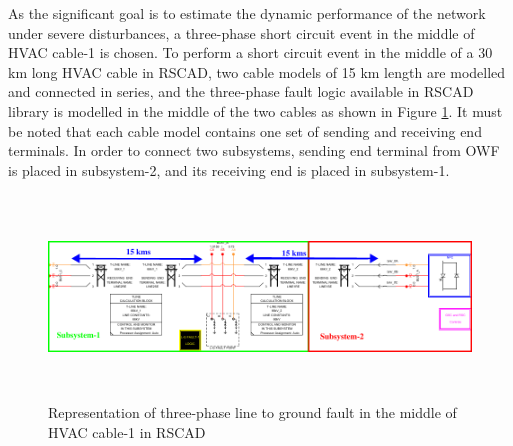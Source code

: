 As the significant goal is to estimate the dynamic performance of the network under severe disturbances, a three-phase short circuit event in the middle of \gls{HVAC} cable-1 is chosen. To perform a short circuit event in the middle of a 30 km long \gls{HVAC} cable in RSCAD, two cable models of 15 km length are modelled and connected in series, and the three-phase fault logic available in RSCAD library is modelled in the middle of the two cables as shown in Figure \ref{fig:Subsystem_Trial}. It must be noted that each cable model contains one set of sending and receiving end terminals. In order to connect two subsystems, sending end terminal from \gls{OWF} is placed in subsystem-2, and its receiving end is placed in subsystem-1. %

\begin{figure}[H]
\centering
    \includegraphics[height = 5.4cm,width = 17cm]{Diagrams/Chapter_4/subsystem_fault_mark.pdf}
    \caption{Representation of three-phase line to ground fault in the middle of HVAC cable-1 in RSCAD}
    \label{fig:Subsystem_Trial}
\end{figure}

